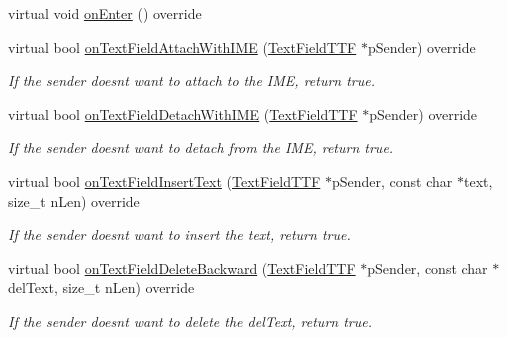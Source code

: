 \begin{DoxyCompactItemize}
virtual void \hyperlink{classui_1_1UICCTextField_ab4689762548b34a3309d8679b3add550}{on\+Enter} () override
\item 
\mbox{\label{classui_1_1UICCTextField_a135529d7d297d3e5598faf031c559a8b}} 
virtual bool \hyperlink{classui_1_1UICCTextField_a135529d7d297d3e5598faf031c559a8b}{on\+Text\+Field\+Attach\+With\+I\+ME} (\hyperlink{classTextFieldTTF}{Text\+Field\+T\+TF} $\ast$p\+Sender) override
\begin{DoxyCompactList}\small\item\em If the sender doesn\textquotesingle{}t want to attach to the I\+ME, return true. \end{DoxyCompactList}\item 
\mbox{\label{classui_1_1UICCTextField_ae01e5eb5b632db9683bb4b4eb698fe22}} 
virtual bool \hyperlink{classui_1_1UICCTextField_ae01e5eb5b632db9683bb4b4eb698fe22}{on\+Text\+Field\+Detach\+With\+I\+ME} (\hyperlink{classTextFieldTTF}{Text\+Field\+T\+TF} $\ast$p\+Sender) override
\begin{DoxyCompactList}\small\item\em If the sender doesn\textquotesingle{}t want to detach from the I\+ME, return true. \end{DoxyCompactList}\item 
\mbox{\label{classui_1_1UICCTextField_a50d55252aaf08d666ab1367eac85a367}} 
virtual bool \hyperlink{classui_1_1UICCTextField_a50d55252aaf08d666ab1367eac85a367}{on\+Text\+Field\+Insert\+Text} (\hyperlink{classTextFieldTTF}{Text\+Field\+T\+TF} $\ast$p\+Sender, const char $\ast$text, size\+\_\+t n\+Len) override
\begin{DoxyCompactList}\small\item\em If the sender doesn\textquotesingle{}t want to insert the text, return true. \end{DoxyCompactList}\item 
\mbox{\label{classui_1_1UICCTextField_aebd88d54b0d5c40891e4d0d74a91437b}} 
virtual bool \hyperlink{classui_1_1UICCTextField_aebd88d54b0d5c40891e4d0d74a91437b}{on\+Text\+Field\+Delete\+Backward} (\hyperlink{classTextFieldTTF}{Text\+Field\+T\+TF} $\ast$p\+Sender, const char $\ast$del\+Text, size\+\_\+t n\+Len) override
\begin{DoxyCompactList}\small\item\em If the sender doesn\textquotesingle{}t want to delete the del\+Text, return true. \end{DoxyCompactList}\item 

\end{DoxyCompactItemize}
